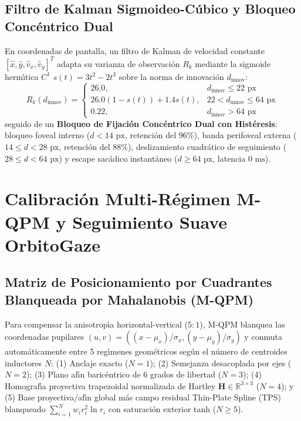 \documentclass[twocolumn,10pt]{article}
\begin{document}
\subsection{Filtro de Kalman Sigmoideo-C\'ubico y Bloqueo Conc\'entrico Dual}
En coordenadas de pantalla, un filtro de Kalman de velocidad constante $[\hat{x}, \hat{y}, \hat{v}_x, \hat{v}_y]^T$ adapta su varianza de observaci\'on $R_k$ mediante la sigmoide herm\'{\i}tica $C^1$ $s(t) = 3t^2 - 2t^3$ sobre la norma de innovaci\'on $d_{\text{innov}}$:
\begin{equation}
R_k(d_{\text{innov}}) = \begin{cases} 26.0, & d_{\text{innov}} \le 22\text{ px} \\ 26.0(1 - s(t)) + 1.4 s(t), & 22 < d_{\text{innov}} \le 64\text{ px} \\ 0.22, & d_{\text{innov}} > 64\text{ px} \end{cases}
\end{equation}
seguido de un \textbf{Bloqueo de Fijaci\'on Conc\'entrico Dual con Hist\'eresis}: bloqueo foveal interno ($d < 14\text{ px}$, retenci\'on del $96\%$), banda perifoveal externa ($14 \le d < 28\text{ px}$, retenci\'on del $88\%$), deslizamiento cuadr\'atico de seguimiento ($28 \le d < 64\text{ px}$) y escape sac\'adico instant\'aneo ($d \ge 64\text{ px}$, latencia $0\text{ ms}$).

\section{Calibraci\'on Multi-R\'egimen M-QPM y Seguimiento Suave OrbitoGaze}
\label{sec:calibration}

\subsection{Matriz de Posicionamiento por Cuadrantes Blanqueada por Mahalanobis (M-QPM)}
Para compensar la anisotrop\'{\i}a horizontal-vertical ($5:1$), M-QPM blanquea las coordenadas pupilares $(u, v) = ((x - \mu_x)/\sigma_x, (y - \mu_y)/\sigma_y)$ y conmuta autom\'aticamente entre 5 reg\'{\i}menes geom\'etricos seg\'un el n\'umero de centroides inductores $N$: (1) Anclaje exacto ($N=1$); (2) Semejanza desacoplada por ejes ($N=2$); (3) Plano af\'{\i}n baric\'entrico de 6 grados de libertad ($N=3$); (4) Homograf\'{\i}a proyectiva trapezoidal normalizada de Hartley $\mathbf{H} \in \mathbb{R}^{3\times 3}$ ($N=4$); y (5) Base proyectiva/af\'{\i}n global m\'as campo residual Thin-Plate Spline (TPS) blanqueado $\sum_{i=1}^N w_i r_i^2 \ln r_i$ con saturaci\'on exterior tanh ($N \ge 5$).
\end{document}
